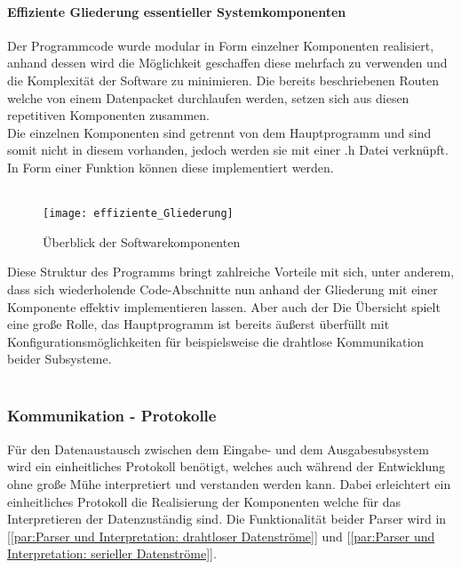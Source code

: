 \documentclass[titlepage,12pt,twoside]{article}
\begin{document}
\paragraph{Effiziente Gliederung essentieller Systemkomponenten}
\hfill \break
\hfill \break
Der Programmcode wurde modular in Form einzelner Komponenten realisiert, anhand dessen wird die Möglichkeit geschaffen diese mehrfach zu verwenden und 
die Komplexität der Software zu minimieren. Die bereits beschriebenen Routen welche von einem Datenpacket durchlaufen werden, setzen sich aus diesen 
repetitiven Komponenten zusammen. \\
Die einzelnen Komponenten sind getrennt von dem Hauptprogramm und sind somit nicht in diesem vorhanden, jedoch werden sie mit einer .h Datei verknüpft. 
In Form einer Funktion können diese implementiert werden. \\
\\
\begin{figure}[H]
	\begin{center}
		\scalebox{0.7}
		{\texttt{[image: effiziente\_Gliederung]}}
		\caption{Überblick der Softwarekomponenten}
		\label{fig:effiziente_Gliederung}		
	\end{center}
\end{figure}
\hfill \break
Diese Struktur des Programms bringt zahlreiche Vorteile mit sich, unter anderem, dass sich wiederholende Code-Abschnitte nun anhand der Gliederung mit 
einer Komponente effektiv implementieren lassen. Aber auch der Die Übersicht spielt eine große Rolle, das Hauptprogramm ist bereits äußerst überfüllt 
mit Konfigurationsmöglichkeiten für beispielsweise die drahtlose Kommunikation beider Subsysteme. \\
\\

\subsubsection{Kommunikation - Protokolle}
\label{chap:Kommunikation-Protokolle}
Für den Datenaustausch zwischen dem Eingabe- und dem Ausgabesubsystem wird ein einheitliches Protokoll benötigt, welches auch während der Entwicklung 
ohne große Mühe interpretiert und verstanden werden kann. Dabei erleichtert ein einheitliches Protokoll die Realisierung der Komponenten welche für das 
Interpretieren der Datenzuständig sind. Die Funktionalität beider Parser wird in [\textcolor{blue}{\autoref{par:Parser und Interpretation: drahtloser Datenströme}}]
und [\textcolor{blue}{\autoref{par:Parser und Interpretation: serieller Datenströme}}]. \\
\\
\end{document}
